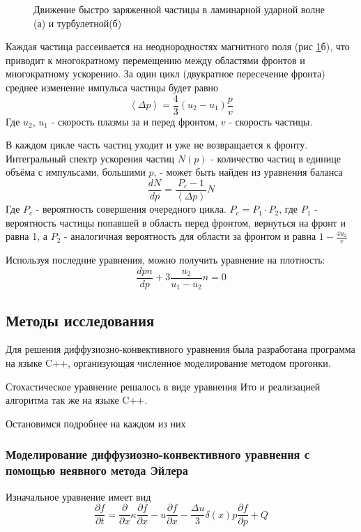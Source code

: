 \documentclass[a4paper,11pt]{article} %
\begin{document}
\begin{figure}[htbp]
  \centering
  
  \caption{\label{intro/lam} Движение быстро заряженной частицы в ламинарной ударной волне (а) и турбулетной(б)}
\end{figure}
Каждая частица рассеивается на неоднородностях магнитного поля (рис \ref{intro/lam}б), что приводит к многократному перемещению между областями фронтов и многократному ускорению. За один цикл (двукратное пересечение фронта) среднее изменение импульса частицы будет равно
\begin{equation}
\left< \Delta p \right> = \frac{4}{3} (u_2-u_1)\frac{p}{v}
\end{equation}
Где $u_2$, $u_1$ - скорость плазмы за и перед фронтом, $v$ - скорость частицы.

В каждом цикле часть частиц уходит и уже не возвращается к фронту. Интегральный спектр ускорения частиц $N(p)$ - количество частиц в единице объёма с импульсами, большими $p$,  - может быть найден из уравнения баланса
\begin{equation}
\frac{dN}{dp}=\frac{P_c-1}{\left<\Delta p \right>}N
\end{equation}
Где $P_c$ - вероятность совершения очередного цикла. $P_c=P_1 \cdot P_2$, где $P_1$ - вероятность частицы попавшей в область перед фронтом, вернуться на фронт и равна 1, а $P_2$ - аналогичная вероятность для области за фронтом и равна $1-\frac{4u_2}{v}$

Используя последние уравнения, можно получить уравнение на плотность:
\begin{equation}
\frac{d pn}{dp} + 3 \frac{u_2}{u_1-u_2} n = 0
\end{equation}
\subsection{Методы исследования}
Для решения диффузиозно-конвективного уравнения была разработана программа на языке C++, организующая численное моделирование методом прогонки.

Стохастическое уравнение решалось в виде уравнения Ито и реализацией алгоритма так же на языке C++.

Остановимся подробнее на каждом из них
\subsubsection{Моделирование диффузиозно-конвективного уравнения с помощью неявного метода Эйлера}
Изначальное уравнение имеет вид
\begin{equation}
\frac{\partial f}{\partial t} = \frac{\partial}{\partial x} \kappa \frac{\partial f}{\partial x} - u \frac{\partial f}{\partial x} - \frac{\Delta u}{3} \delta(x) p \frac{\partial f}{\partial p} +Q
\end{equation}
\end{document}
